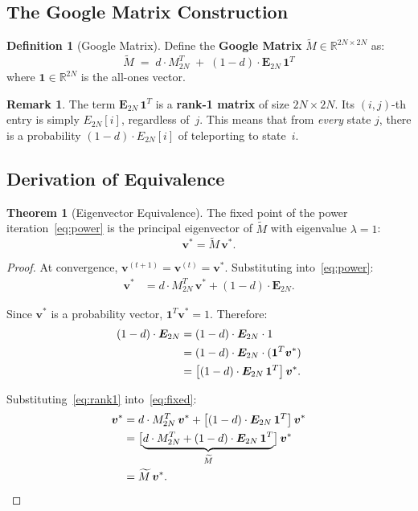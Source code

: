 \documentclass[11pt,a4paper]{article}
\theoremstyle{definition}
\newtheorem{definition}{Definition}
\newtheorem{theorem}{Theorem}
\newtheorem{remark}{Remark}
\begin{document}
\subsection{The Google Matrix Construction}

\begin{definition}[{Google Matrix}]
Define the \textbf{Google Matrix} $\widetilde{M} \in \mathbb{R}^{2N \times 2N}$ as:
\begin{equation}\label{eq:google}
\boxed{
\widetilde{M} \;=\; d \cdot M_{2N}^T
\;+\; (1-d) \cdot \bm{E}_{2N}\,\bm{1}^T
}
\end{equation}
where $\bm{1} \in \mathbb{R}^{2N}$ is the all-ones vector.
\end{definition}

\begin{remark}
The term $\bm{E}_{2N}\,\bm{1}^T$ is a \textbf{rank-1 matrix} of size
$2N \times 2N$.  Its $(i,j)$-th entry is simply $E_{2N}[i]$, regardless
of~$j$.  This means that from \emph{every} state $j$, there is a
probability $(1-d)\cdot E_{2N}[i]$ of teleporting to state~$i$.
\end{remark}

\subsection{Derivation of Equivalence}

\begin{theorem}[{Eigenvector Equivalence}]\label{thm:equiv}
The fixed point of the power iteration~\eqref{eq:power} is the principal
eigenvector of $\widetilde{M}$ with eigenvalue $\lambda = 1$:
\[
\bm{v}^* = \widetilde{M}\,\bm{v}^*.
\]
\end{theorem}

\begin{proof}
At convergence, $\bm{v}^{(t+1)} = \bm{v}^{(t)} = \bm{v}^*$.
Substituting into~\eqref{eq:power}:
\begin{align}
\bm{v}^* &= d \cdot M_{2N}^T\,\bm{v}^*
           + (1-d) \cdot \bm{E}_{2N}. \label{eq:fixed}
\end{align}

Since $\bm{v}^*$ is a probability vector, $\bm{1}^T \bm{v}^* = 1$.
Therefore:
\begin{align}
(1-d) \cdot \bm{E}_{2N}
&= (1-d) \cdot \bm{E}_{2N} \cdot 1 \notag \\
&= (1-d) \cdot \bm{E}_{2N} \cdot (\bm{1}^T \bm{v}^*) \notag \\
&= \bigl[(1-d) \cdot \bm{E}_{2N}\,\bm{1}^T\bigr]\,\bm{v}^*. \label{eq:rank1}
\end{align}

Substituting~\eqref{eq:rank1} into~\eqref{eq:fixed}:
\begin{align}
\bm{v}^*
&= d \cdot M_{2N}^T\,\bm{v}^*
 + \bigl[(1-d) \cdot \bm{E}_{2N}\,\bm{1}^T\bigr]\,\bm{v}^* \notag \\
&= \bigl[\underbrace{d \cdot M_{2N}^T
 + (1-d) \cdot \bm{E}_{2N}\,\bm{1}^T}_{\widetilde{M}}\bigr]\,\bm{v}^* \notag \\
&= \widetilde{M}\,\bm{v}^*. \qedhere
\end{align}
\end{proof}
\end{document}
